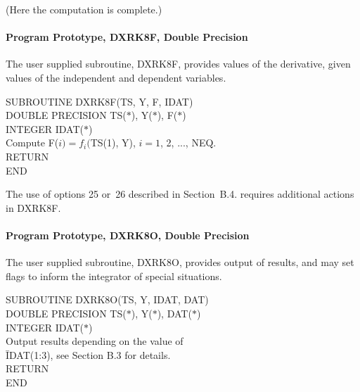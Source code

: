\documentclass[twoside]{MATH77}
\begin{document}

(Here the computation is complete.)

\paragraph{Program Prototype, DXRK8F, Double Precision\label{DXRK8F}}

The user supplied subroutine, DXRK8F, provides values of the derivative,
given values of the independent and dependent variables.
{\tt \begin{tabbing}
  SUBROUTINE DXRK8F(TS, Y, F, IDAT)\\
  DOUBLE PRECISION TS($\ast$), Y($\ast$), F($\ast$)\\
  INTEGER IDAT($\ast$)\\
  Compute F($i) = f_i($TS(1), Y), $i = 1$, 2, ..., NEQ.\\
  RETURN\\
  END
\end{tabbing}}
\vspace{-5pt}

The use of options 25 or~26 described in Section~B.4. requires
additional actions in DXRK8F.

\paragraph{Program Prototype, DXRK8O, Double Precision\label{DXRK8O}}

The user supplied subroutine, DXRK8O, provides output of results, and
may set flags to inform the integrator of special situations.
{\tt \begin{tabbing}
 SUBROUTINE DXRK8O(TS, Y, IDAT, DAT)\\
 DOUBLE PRECISION TS($\ast$), Y($\ast$), DAT($\ast$)\\
 INTEGER IDAT($\ast$)\\
 Output results depending on the value of\\
 \quad \=IDAT(1:3), see Section B.3 for details.\\
 RETURN\\
 END
\end{tabbing}}\vspace{-10pt}
\end{document}
